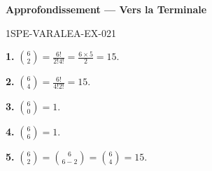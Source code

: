 \begin{center}\textbf{Approfondissement — Vers la Terminale}\end{center}
\begin{corrige}{1SPE-VARALEA-EX-021}

\textbf{1.} $\binom{6}{2} = \frac{6!}{2!4!} = \frac{6 \times 5}{2} = 15$.

\textbf{2.} $\binom{6}{4} = \frac{6!}{4!2!} = 15$.

\textbf{3.} $\binom{6}{0} = 1$.

\textbf{4.} $\binom{6}{6} = 1$.

\textbf{5.} $\binom{6}{2} = \binom{6}{6-2} = \binom{6}{4} = 15$. \checkmark

\end{corrige}
